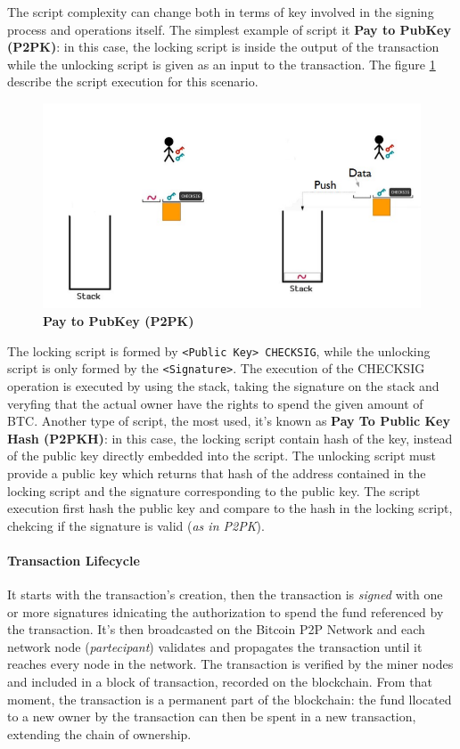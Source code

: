 \documentclass[10pt,a4paper]{report}
\begin{document}
The script complexity can change both in terms of key involved in the signing process and operations itself.
The simplest example of script it \textbf{Pay to PubKey (P2PK)}: in this case, the locking script is inside the output of the transaction while the unlocking script is given as an input to the transaction. The figure \ref{p2pk} describe the script execution for this scenario.
\begin{figure}[h]
	\centering
	\includegraphics[scale=0.50]{images/Pasted image 20230331143056.png}
	\caption{\textbf{Pay to PubKey (P2PK)}}
	\label{p2pk}
\end{figure}

The locking script is formed by \texttt{<Public Key> CHECKSIG}, while the unlocking script is only formed by the \texttt{<Signature>}. The execution of the CHECKSIG operation is executed by using the stack, taking the signature on the stack and veryfing that the actual owner have the rights to spend the given amount of BTC.
Another type of script, the most used, it's known as \textbf{Pay To Public Key Hash (P2PKH)}: in this case, the locking script contain hash of the key, instead of the public key directly embedded into the script.
The unlocking script must provide a public key which returns that hash of the address contained in the locking script and the signature corresponding to the public key. The script execution first hash the public key and compare to the hash in the locking script, chekcing if the signature is valid (\textit{as in P2PK}).


\paragraph{Transaction Lifecycle}\label{sec:transaction-lifecycle}
It starts with the transaction's creation, then the transaction is \textit{signed} with one or more signatures idnicating the authorization to spend the fund referenced by the transaction. It's then broadcasted on the Bitcoin P2P Network and each network node (\textit{partecipant}) validates and propagates the transaction until it reaches every node in the network.
The transaction is verified by the miner nodes and included in a block of transaction, recorded on the blockchain. From that moment, the transaction is a permanent part of the blockchain: the fund llocated to a new owner by the transaction can then be spent in a new transaction, extending the chain of ownership.
\end{document}
